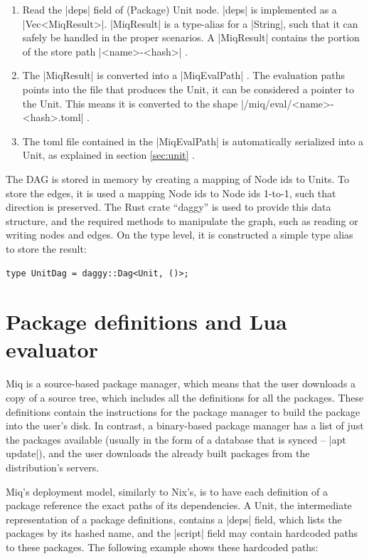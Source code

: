 \begin{enumerate}
    \item Read the |deps| field of (Package) Unit node.
    |deps| is implemented as a |Vec<MiqResult>|. |MiqResult|
    is a type-alias for a |String|, such that it can safely
    be handled in the proper scenarios. A |MiqResult|
    contains the portion of the store path |<name>-<hash>| .

    \item The |MiqResult| is converted into a |MiqEvalPath|
    . The evaluation paths points into the file that
    produces the Unit, it can be considered a pointer to the
    Unit. This means it is converted to the shape
    |/miq/eval/<name>-<hash>.toml| .

    \item The toml file contained in the |MiqEvalPath| is
    automatically serialized into a Unit, as explained in
    section \ref{sec:unit} .
\end{enumerate}

The \ac{DAG} is stored in memory by creating a mapping of
Node ids to Units. To store the edges, it is used a mapping Node ids to
Node ids 1-to-1, such that direction is preserved. The Rust
crate ``daggy'' \cite{DaggyRust} is used to provide this
data structure, and the required methods to manipulate the
graph, such as reading or writing nodes and edges. On the
type level, it is
constructed a simple type alias to store the result:

\begin{verbatim}
type UnitDag = daggy::Dag<Unit, ()>;
\end{verbatim}

\section{Package definitions and Lua evaluator}
\label{sec:lua}

Miq is a source-based package manager, which means that the
user downloads a copy of a source tree, which includes all
the definitions for all the packages. These definitions
contain the instructions for the package manager to build
the package into the user's disk. In contrast, a binary-based
package manager has a list of just the packages available
(usually in the form of a database that is synced -- |apt update|), and the user downloads the already built packages
from the distribution's servers.

Miq's deployment model, similarly to Nix's, is to have each
definition of a package reference the exact paths of its
dependencies. A Unit, the intermediate representation of a
package definitions, contains a |deps| field, which lists the
packages by its hashed name, and the |script| field may
contain hardcoded paths to these packages. The following
example shows these hardcoded paths:

